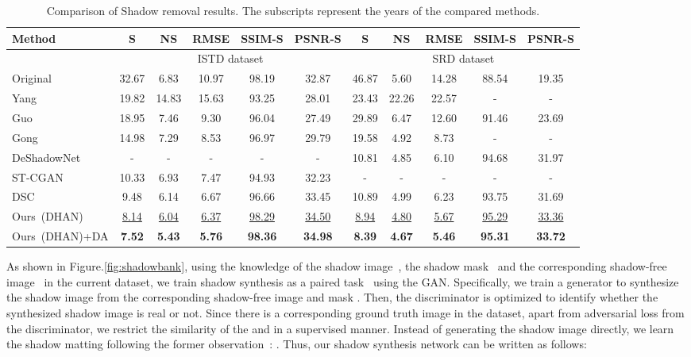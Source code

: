 \documentclass[letterpaper]{article} \usepackage{aaai20}  \usepackage{times}  \usepackage{helvet} \usepackage{courier}  \usepackage[hyphens]{url}  \urlstyle{rm} \def\UrlFont{\rm}  \usepackage{graphicx}  \frenchspacing  \setlength{\pdfpagewidth}{8.5in}  \setlength{\pdfpageheight}{11in}  \usepackage{amssymb}
\begin{document}
\begin{table*}[t]
\begin{center}
\caption{Comparison of Shadow removal results. The subscripts represent the years of the compared methods.}
\label{table:rmse}
\begin{tabular}{|l|c|c|c|c|c|c|c|c|c|c|}
\hline
Method & S & NS & RMSE  & SSIM-S  & PSNR-S & S & NS & RMSE  & SSIM-S  & PSNR-S  \\
\hline
& \multicolumn{5}{|c|}{ISTD dataset} & \multicolumn{5}{|c|}{SRD dataset} \\
\hline
Original  & 32.67 & 6.83 & 10.97 & 98.19 & 32.87 & 46.87 & 5.60 & 14.28 & 88.54 & 19.35 \\
Yang  &  19.82      &  14.83     & 15.63   & 93.25 & 28.01  &  23.43      &  22.26     & 22.57  & -  &  - \\
Guo  &  18.95      &   7.46     & 9.30   & 96.04 & 27.49 &  29.89     &   6.47     & 12.60   & 91.46 & 23.69   \\
Gong  & 14.98 &  7.29 & 8.53  & 96.97 & 29.79 & 19.58 &  4.92 & 8.73  & - & - \\
DeShadowNet  &  -   & - & - & - &  - &  10.81 & 4.85 & 6.10  & 94.68 & 31.97 \\
ST-CGAN    &  10.33   & 6.93 & 7.47  & 94.93  &  32.23 & - & - & -&- & -\\
DSC  &   9.48      &  6.14   & 6.67   &   96.66     &  33.45  & 10.89  & 4.99 &  6.23  & 93.75  & 31.69 \\
Ours~(DHAN)  &  \underline{8.14} & \underline{6.04} & \underline{6.37} & \underline{98.29} & \underline{34.50} &  \underline{8.94} & \underline{4.80} & \underline{5.67} & \underline{95.29} & \underline{33.36} \\
Ours~(DHAN)+DA    & \textbf{7.52}  & \textbf{5.43} & \textbf{5.76} & \textbf{98.36} & \textbf{34.98}  & \textbf{8.39} & \textbf{4.67} & \textbf{5.46} & \textbf{95.31}  & \textbf{33.72} \\
\hline
\end{tabular}
\end{center}
\end{table*}

As shown in Figure.\ref{fig:shadowbank}, using the knowledge of the shadow image~, the shadow mask~ and the corresponding shadow-free image~ in the current dataset, we train shadow synthesis as a paired task~\cite{isola2017image} using the GAN. Specifically, we train a generator to synthesize the shadow image  from the corresponding shadow-free image  and mask . Then, the discriminator is optimized to identify whether the synthesized shadow image  is real or not. Since there is a corresponding ground truth image  in the dataset, apart from adversarial loss from the discriminator, we restrict the similarity of the  and  in a supervised manner. Instead of generating the shadow image directly, we learn the shadow matting  following the former observation~\cite{qu2017deshadownet}: . Thus, our shadow synthesis network can be written as follows:
\end{document}
